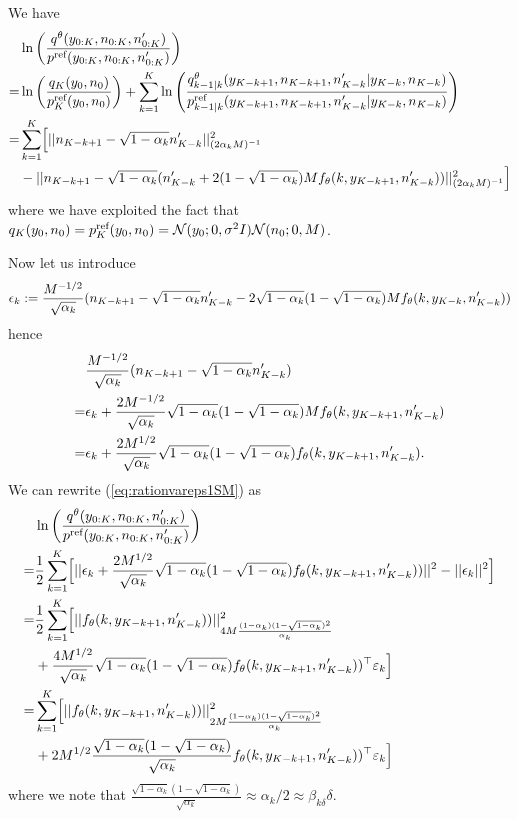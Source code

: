 \documentclass{article} %
\begin{document}
We have 
\begin{align}
    &\log  \left(\frac{q^{\theta}(y_{0:K},n_{0:K},n'_{0:K})}{p^{\textup{ref}}(y_{0:K},n_{0:K},n'_{0:K})}\right)  \label{eq:rationvareps1SM} \\
    =&\log \left( \frac{q_{K}(y_0,n_0)}{p^{\textup{ref}}_{K}(y_0,n_0)} \right)+\sum_{k=1}^K 
    \log \left( \frac{q^{\theta}_{k-1|k}(y_{K-k+1},n_{K-k+1},n'_{K-k}|y_{K-k},n_{K-k})}{p^{\textup{ref}}_{k-1|k}(y_{K-k+1},n_{K-k+1},n'_{K-k}|y_{K-k},n_{K-k})} \right) \nonumber \\
    =& \sum_{k=1}^K \Bigr[ ||n_{K-k+1}-\sqrt{1-\alpha_k}n'_{K-k}||^2_{(2\alpha_k M)^{-1}} \nonumber \\
    &- ||n_{K-k+1}-\sqrt{1-\alpha_{k}}(n'_{K-k}+2(1-\sqrt{1-\alpha_{k}})M f_{\theta}(k,y_{K-k+1},n'_{K-k}))||^2_{(2\alpha_k M)^{-1}} \Bigr] \nonumber
\end{align}
where we have exploited the fact that $q_{K}(y_0,n_0)=p^{\textup{ref}}_{K}(y_0,n_0)=\mathcal{N}(y_0;0,\sigma^2 I)\mathcal{N}(n_0;0,M)$.

Now let us introduce 
\begin{equation}
    \vepsilon_k:=\frac{M^{-1/2}}{\sqrt{\alpha_k}}(n_{K-k+1}-\sqrt{1-\alpha_k}n'_{K-k}-2\sqrt{1-\alpha_k}(1-\sqrt{1-\alpha_k})Mf_{\theta}(k,y_{K-k},n'_{K-k}))
\end{equation}
hence 
\begin{align*}
     &\frac{M^{-1/2}}{\sqrt{\alpha_k}}(n_{K-k+1}-\sqrt{1-\alpha_k}n'_{K-k})\\
     =& \vepsilon_k+ \frac{2M^{-1/2}}{\sqrt{\alpha_k}}\sqrt{1-\alpha_k}(1-\sqrt{1-\alpha_k})Mf_{\theta}(k,y_{K-k+1},n'_{K-k})\\
     =&\vepsilon_k+ \frac{2M^{1/2}}{\sqrt{\alpha_k}}\sqrt{1-\alpha_k}(1-\sqrt{1-\alpha_k})f_{\theta}(k,y_{K-k+1},n'_{K-k}).
\end{align*}
We can rewrite (\ref{eq:rationvareps1SM}) as 
\begin{align}\label{eq:logDTRN2underdampedSM}
    &\log  \left(\frac{q^{\theta}(y_{0:K},n_{0:K},n'_{0:K})}{p^{\textup{ref}}(y_{0:K},n_{0:K},n'_{0:K})}\right)   \\
    =& \frac{1}{2} \sum_{k=1}^K \Bigr[||\vepsilon_k+ \frac{2M^{1/2}}{\sqrt{\alpha_k}}\sqrt{1-\alpha_k}(1-\sqrt{1-\alpha_k})f_{\theta}(k,y_{K-k+1},n'_{K-k}))||^2-||\vepsilon_k||^2  \Bigr] \nonumber\\
    =& \frac{1}{2} \sum_{k=1}^K \Bigr[||f_{\theta}(k,y_{K-k+1},n'_{K-k}))||^2_{4M\frac{(1-\alpha_k)(1-\sqrt{1-\alpha_k})^2}{\alpha_k}}  \nonumber\\
    &+\frac{4M^{1/2}}{\sqrt{\alpha_k}}\sqrt{1-\alpha_k}(1-\sqrt{1-\alpha_k})f_{\theta}(k,y_{K-k+1},n'_{K-k}))^\top \varepsilon_k  \Bigr] \nonumber\\
    =& \sum_{k=1}^K \Bigr[||f_{\theta}(k,y_{K-k+1},n'_{K-k}))||^2_{2M\frac{(1-\alpha_k)(1-\sqrt{1-\alpha_k})^2}{\alpha_k}} \nonumber\\
    &+2M^{1/2}\frac{\sqrt{1-\alpha_k}(1-\sqrt{1-\alpha_k})}{\sqrt{\alpha_k}}f_{\theta}(k,y_{K-k+1},n'_{K-k}))^\top \varepsilon_k  \Bigr] \nonumber
\end{align}
where we note that $\frac{\sqrt{1-\alpha_k}(1-\sqrt{1-\alpha_k})}{\sqrt{\alpha_k}}\approx \alpha_k/2 \approx \beta_{k\delta}\delta$.
\end{document}
